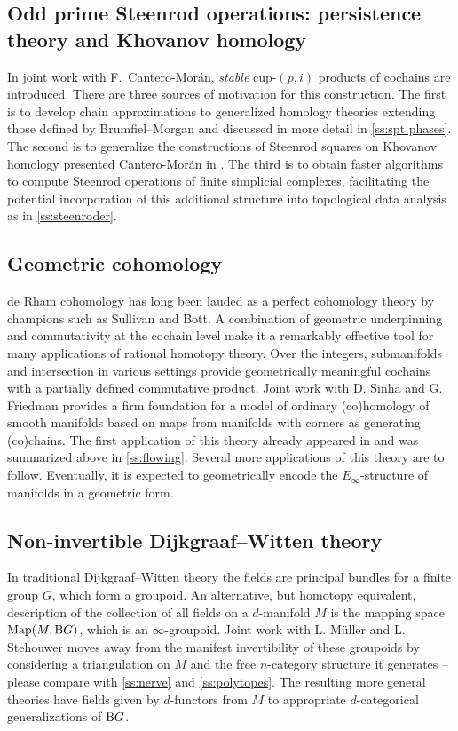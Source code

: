\subsection{Odd prime Steenrod operations: persistence theory and Khovanov homology} \label{ss:odd prime steenrod operations}

In joint work with F.~Cantero-Mor\'an, \emph{stable} cup-$(p,i)$ products of cochains are introduced.
There are three sources of motivation for this construction.
The first is to develop chain approximations to generalized homology theories extending those defined by Brumfiel--Morgan and discussed in more detail in \cref{ss:spt phases}.
The second is to generalize the constructions of Steenrod squares on Khovanov homology presented Cantero-Mor\'an in \cite{cantero-moran2020khovanov}.
The third is to obtain faster algorithms to compute Steenrod operations of finite simplicial complexes, facilitating the potential incorporation of this additional structure into topological data analysis as in \cref{ss:steenroder}.


\subsection{Geometric cohomology} \label{ss:geometric cohomology}

de Rham cohomology has long been lauded as a perfect cohomology theory by champions such as Sullivan and Bott.
A combination of geometric underpinning and commutativity at the cochain level make it a remarkably effective tool for many applications of rational homotopy theory.
Over the integers, submanifolds and intersection in various settings provide geometrically meaningful cochains with a partially defined commutative product.
Joint work with D. Sinha and G. Friedman provides a firm foundation for a model of ordinary (co)homology of smooth manifolds based on maps from manifolds with corners as generating (co)chains.
The first application of this theory already appeared in \cite{medina2021flowing} and was summarized above in \cref{ss:flowing}.
Several more applications of this theory are to follow.
Eventually, it is expected to geometrically encode the $E_\infty$-structure of manifolds in a geometric form.

\subsection{Non-invertible Dijkgraaf--Witten theory}

In traditional Dijkgraaf--Witten theory the fields are principal bundles for a finite
group $G$, which form a groupoid.
An alternative, but homotopy equivalent, description of the collection of all fields on a $d$-manifold $M$ is the mapping space $\mathrm{Map}(M, \mathrm{B} G)$, which is an $\infty$-groupoid.
Joint work with L. M\"uller and L. Stehouwer moves away from the manifest invertibility of these groupoids by considering a triangulation on $M$ and the free $n$-category structure it generates -- please compare with \cref{ss:nerve} and \cref{ss:polytopes}.
The resulting more general theories have fields given by $d$-functors from $M$ to appropriate $d$-categorical generalizations of $\mathrm{B} G$.